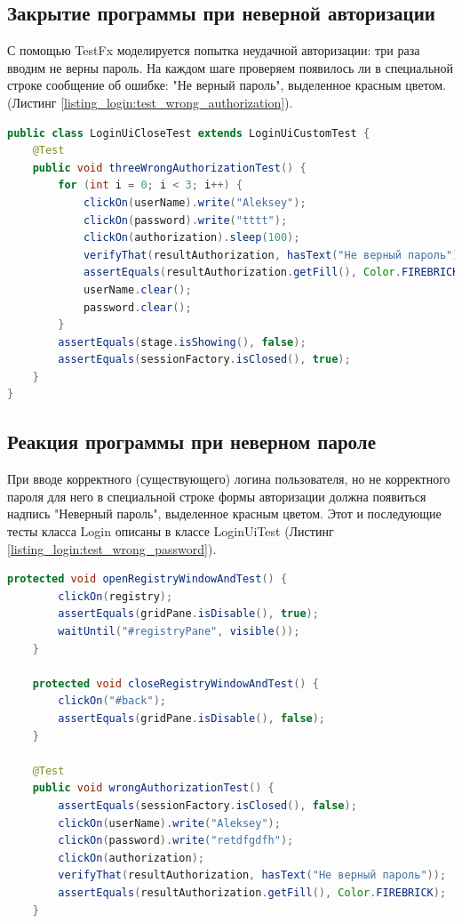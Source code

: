 \documentclass[a4paper,12pt]{article}
\begin{document}
\subsection{Закрытие программы при неверной авторизации}
С помощью TestFx моделируется попытка неудачной авторизации: три раза вводим не верны пароль. На каждом шаге проверяем появилось ли в специальной строке сообщение об ошибке: "Не верный пароль", выделенное красным цветом. (Листинг \ref{listing_login:test_wrong_authorization}).
\begin{lstlisting}[language=java, caption=Тестирование неверной авторизации, label=listing_login:test_wrong_authorization]
public class LoginUiCloseTest extends LoginUiCustomTest {
    @Test
    public void threeWrongAuthorizationTest() {
        for (int i = 0; i < 3; i++) {
            clickOn(userName).write("Aleksey");
            clickOn(password).write("tttt");
            clickOn(authorization).sleep(100);
            verifyThat(resultAuthorization, hasText("Не верный пароль"));
            assertEquals(resultAuthorization.getFill(), Color.FIREBRICK);
            userName.clear();
            password.clear();
        }
        assertEquals(stage.isShowing(), false);
        assertEquals(sessionFactory.isClosed(), true);
    }
}
\end{lstlisting}

\subsection{Реакция программы при неверном пароле}
При вводе корректного (существующего) логина пользователя, но не корректного пароля для него в специальной строке формы авторизации должна появиться надпись "Неверный пароль", выделенное красным цветом. Этот и последующие тесты класса Login описаны в классе LoginUiTest (Листинг \ref{listing_login:test_wrong_password}).

\begin{lstlisting}[language=java, caption=Тестирование правильной авторизации, label=listing_login:test_true_autorization]
	protected void openRegistryWindowAndTest() {
        clickOn(registry);
        assertEquals(gridPane.isDisable(), true);
        waitUntil("#registryPane", visible());
    }

    protected void closeRegistryWindowAndTest() {
        clickOn("#back");
        assertEquals(gridPane.isDisable(), false);
    }    
    
    @Test
    public void wrongAuthorizationTest() {
        assertEquals(sessionFactory.isClosed(), false);
        clickOn(userName).write("Aleksey");
        clickOn(password).write("retdfgdfh");
        clickOn(authorization);
        verifyThat(resultAuthorization, hasText("Не верный пароль"));
        assertEquals(resultAuthorization.getFill(), Color.FIREBRICK);
    }
\end{lstlisting}
\end{document}
